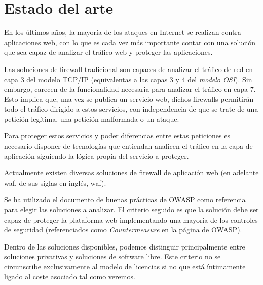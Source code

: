 \chapter{Estado del arte}
\par En los últimos años, la mayoría de los ataques en Internet se realizan contra aplicaciones web, con lo que es cada vez más importante
contar con una solución que sea capaz de analizar el tráfico web y proteger las aplicaciones.
\par Las soluciones de firewall tradicional son capaces de analizar el tráfico de red en capa 3 del modelo TCP/IP (equivalentas a las capas 3 y
4 del {\em modelo OSI\cite{osi}}). Sin embargo, carecen de la funcionalidad necesaria para analizar el tráfico en capa 7. Esto implica que,
una vez se publica un servicio web, dichos firewalls permitirán todo el tráfico dirigido a estos servicios, con independencia de que se trate
de una petición legítima, una petición malformada o un ataque.
\par Para proteger estos servicios y poder diferencias entre estas peticiones es necesario disponer de tecnologías que entiendan analicen el tráfico en la capa de aplicación siguiendo la lógica propia del servicio a proteger.
\par Actualmente existen diversas soluciones de firewall de aplicación web (en adelante \acrshort{waf}, de sus siglas en inglés, \acrlong{waf}).
\par Se ha utilizado el documento de buenas prácticas de OWASP\cite{owaspbestpractices} como referencia para elegir las soluciones a analizar.
El criterio seguido es que la solución debe ser capaz de proteger la plataforma web implementando una mayoría de los controles de seguridad
(referenciados como {\em Countermeasure} en la página de OWASP\cite[apartado A3.2]{owaspbestpractices}).

\par Dentro de las soluciones disponibles, podemos distinguir principalmente entre soluciones privativas y soluciones de software libre. Este
criterio no se circunscribe exclusivamente al modelo de licencias si no que está íntimamente ligado al coste asociado tal como veremos.

